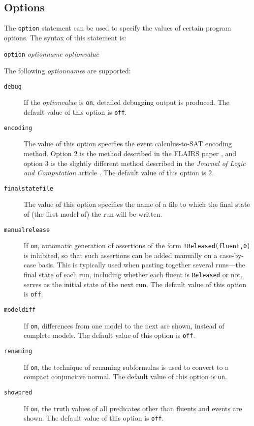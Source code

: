 \documentclass{article}
\begin{document}
\subsection{Options}
The {\tt option} statement can be used to specify the values of certain
program options. The syntax of this statement is:
\begin{flushleft}
{\tt option} {\em optionname} {\em optionvalue}
\end{flushleft}
The following {\em optionname}s are supported:
\begin{description}

\item[{\tt debug}]
If the {\em optionvalue} is {\tt on}, detailed debugging output is
produced.
The default value of this option is {\tt off}.

\item[{\tt encoding}]
The value of this option specifies the event calculus-to-SAT encoding
method.  Option 2 is the method described in the FLAIRS
paper \cite{Mueller:2004b}, and option 3 is the slightly different
method described in the {\em Journal of Logic and Computation} article
\cite{Mueller:2004a}. The default value of this option is 2.

\item[{\tt finalstatefile}]
The value of this option specifies the name of a file to which the
final state of (the first model of) the run will be written.

\item[{\tt manualrelease}]
If {\tt on}, automatic generation of assertions of the form
{\tt !Released(fluent,0)} is inhibited, so that such assertions can be
added manually on a case-by-case basis.
This is typically used when pasting together several runs---the final
state of each run, including whether each fluent is {\tt Released}
or not, serves as the initial state of the next run.
The default value of this option is {\tt off}.

\item[{\tt modeldiff}]
If {\tt on}, differences from one model to the next are shown,
instead of complete models. The default value of this option is {\tt off}.

\item[{\tt renaming}]
If {\tt on}, the technique of renaming subformulas
\cite{PlaistedGreenbaum:1986,GiunchigliaSebastiani:1999} is used to
convert to a compact conjunctive normal. The default value of this
option is {\tt on}.

\item[{\tt showpred}]
If {\tt on}, the truth values of all predicates other than fluents and
events are shown. The default value of this option is {\tt off}.


\end{description}
\end{document}
